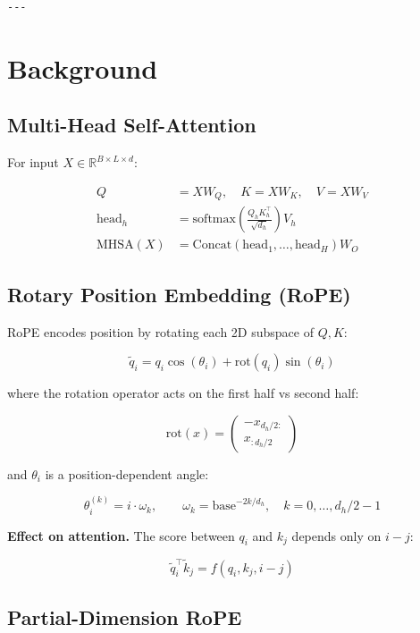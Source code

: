 {\begin{lstlisting}
---
\end{lstlisting}


\section{Background}

\subsection{Multi-Head Self-Attention}

For input $X \in \mathbb{R}^{B \times L \times d}$:

\[
\begin{aligned}
Q &= X W_Q, \quad K = X W_K, \quad V = X W_V \\
\text{head}_h &= \mathrm{softmax}\!\left(\frac{Q_h K_h^\top}{\sqrt{d_h}}\right) V_h \\
\text{MHSA}(X) &= \mathrm{Concat}(\text{head}_1, \dots, \text{head}_H) W_O
\end{aligned}
\tag{3.1}
\]

\subsection{Rotary Position Embedding (RoPE)}

RoPE encodes position by rotating each 2D subspace of $Q, K$:

\[
\tilde{q}_i = q_i \cos(\theta_i) + \mathrm{rot}(q_i) \sin(\theta_i)
\tag{3.2}
\]

where the rotation operator acts on the first half vs second half:

\[
\mathrm{rot}(x) = \begin{pmatrix} -x_{d_h/2:} \\ x_{:d_h/2} \end{pmatrix}
\tag{3.3}
\]

and $\theta_i$ is a position-dependent angle:

\[
\theta_i^{(k)} = i \cdot \omega_k, \qquad
\omega_k = \mathrm{base}^{-2k/d_h}, \quad k = 0, \dots, d_h/2 - 1
\tag{3.4}
\]

\textbf{Effect on attention.} The score between $q_i$ and $k_j$ depends only on 
$i - j$:

\[
\tilde{q}_i^\top \tilde{k}_j = f(q_i, k_j, i - j)
\tag{3.5}
\]

\subsection{Partial-Dimension RoPE}

}
